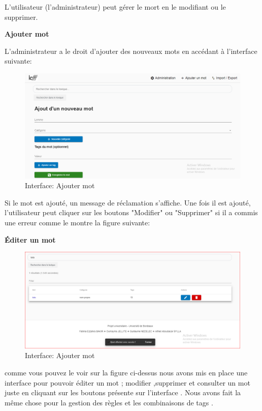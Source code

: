\documentclass[12pt,a4paper]{article}
\begin{document}
L’utilisateur (l’administrateur) peut gérer le mort en le modifiant ou le supprimer.


  
  \textbf{ Ajouter mot}


L'administrateur a le droit d'ajouter des nouveaux mots  en accédant à l'interface suivante: 


\begin{figure}[h]
\centering
\includegraphics[width=150mm]{img/Ajoutermot.PNG}
\caption{Interface: Ajouter mot}
\label{Tux}
\end{figure}


Si le mot  est ajouté, un message de réclamation s'affiche. Une fois il est ajouté, l'utilisateur peut cliquer sur les boutons "Modifier" ou "Supprimer" si il a commis une erreur comme le montre la figure suivante:



 
\textbf{Éditer un mot}
\begin{figure}[h]
\centering
\includegraphics[width=150mm]{img/AjoutEffectuer.PNG}
\caption{Interface: Ajouter mot}
\label{Tux}
\end{figure}

comme vous pouvez le voir sur la figure ci-dessus nous avons mis en place une interface pour pouvoir éditer un mot ; modifier ,supprimer et consulter un mot juste en cliquant sur les boutons présente sur l'interface .
Nous avons fait la même chose pour la gestion des règles et les combinaisons de tags .
\end{document}
